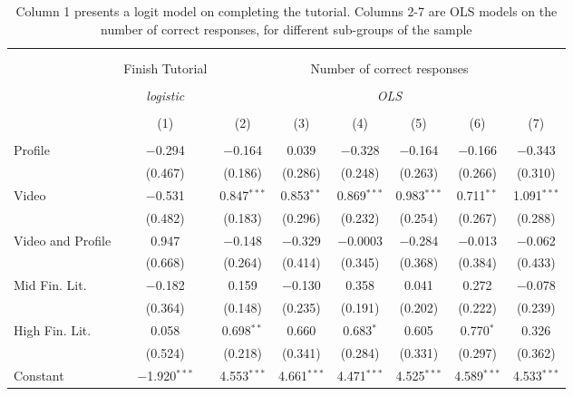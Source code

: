 
\begin{table}[H] \centering 
  \caption{Column 1 presents a logit model on completing the tutorial. Columns 2-7 are OLS models on the number
            of correct responses, for different sub-groups of the sample} 
  \label{tbl:Main_results_correct_response} 
\begin{tabular}{@{\extracolsep{5pt}}lccccccc} 
\\[-1.8ex]\hline 
\hline \\[-1.8ex] 
\\[-1.8ex] & Finish Tutorial & \multicolumn{6}{c}{Number of correct responses} \\ 
\\[-1.8ex] & \textit{logistic} & \multicolumn{6}{c}{\textit{OLS}} \\ 
\\[-1.8ex] & (1) & (2) & (3) & (4) & (5) & (6) & (7)\\ 
\hline \\[-1.8ex] 
 Profile & $-$0.294 & $-$0.164 & 0.039 & $-$0.328 & $-$0.164 & $-$0.166 & $-$0.343 \\ 
  & (0.467) & (0.186) & (0.286) & (0.248) & (0.263) & (0.266) & (0.310) \\ 
  Video & $-$0.531 & 0.847$^{***}$ & 0.853$^{**}$ & 0.869$^{***}$ & 0.983$^{***}$ & 0.711$^{**}$ & 1.091$^{***}$ \\ 
  & (0.482) & (0.183) & (0.296) & (0.232) & (0.254) & (0.267) & (0.288) \\ 
  Video and Profile & 0.947 & $-$0.148 & $-$0.329 & $-$0.0003 & $-$0.284 & $-$0.013 & $-$0.062 \\ 
  & (0.668) & (0.264) & (0.414) & (0.345) & (0.368) & (0.384) & (0.433) \\ 
  Mid Fin. Lit. & $-$0.182 & 0.159 & $-$0.130 & 0.358 & 0.041 & 0.272 & $-$0.078 \\ 
  & (0.364) & (0.148) & (0.235) & (0.191) & (0.202) & (0.222) & (0.239) \\ 
  High Fin. Lit. & 0.058 & 0.698$^{**}$ & 0.660 & 0.683$^{*}$ & 0.605 & 0.770$^{*}$ & 0.326 \\ 
  & (0.524) & (0.218) & (0.341) & (0.284) & (0.331) & (0.297) & (0.362) \\ 
  Constant & $-$1.920$^{***}$ & 4.553$^{***}$ & 4.661$^{***}$ & 4.471$^{***}$ & 4.525$^{***}$ & 4.589$^{***}$ & 4.533$^{***}$ \\ 

\end{tabular}
\end{table}
